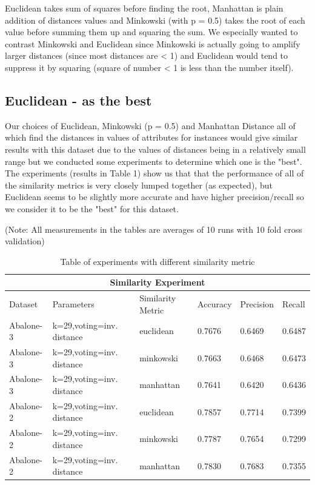 Euclidean takes sum of squares before finding the root, Manhattan is plain addition of distances values and Minkowski (with p = 0.5) takes the root of each value before summing them up and squaring the sum. We especially wanted to contrast Minkowski and Euclidean since Minkowski is actually going to amplify larger distances (since most distances are < 1) and Euclidean would tend to suppress it by squaring (square of number < 1 is less than the number itself). 


\subsection{Euclidean - as the best}

Our choices of Euclidean, Minkowski (p = 0.5) and Manhattan Distance all of which find the distances in values of attributes for instances would give similar results with this dataset due to the values of distances being in a relatively small range but we conducted some experiments to determine which one is the "best". The experiments (results in Table 1) show us that that the performance of all of the similarity metrics is very closely lumped together (as expected), but Euclidean seems to be slightly more accurate and have higher precision/recall so we consider it to be the "best" for this dataset.

(Note: All measurements in the tables are averages of 10 runs with 10 fold cross validation)

\begin{table}[h]
\centering
\begin{tabular}{|p{2cm}|p{3cm}||p{2cm}|p{1.5cm}|p{1.5cm}|p{1.5cm}|}
 \hline
 \multicolumn{6}{|c|}{Similarity Experiment} \\
 \hline
 Dataset & Parameters & Similarity Metric & Accuracy & Precision & Recall\\
 \hline
 Abalone-3 & k=29,voting=inv. distance &   euclidean & 0.7676  & 0.6469 & 0.6487\\
 \hline
 Abalone-3 & k=29,voting=inv. distance &   minkowski & 0.7663 & 0.6468 & 0.6473\\
 \hline
 Abalone-3 & k=29,voting=inv. distance &   manhattan & 0.7641 & 0.6420 & 0.6436\\ 
 \hline
 Abalone-2 & k=29,voting=inv. distance &   euclidean & 0.7857  & 0.7714 & 0.7399\\
 \hline
 Abalone-2 & k=29,voting=inv. distance &   minkowski & 0.7787 & 0.7654 & 0.7299\\
 \hline
 Abalone-2 & k=29,voting=inv. distance &   manhattan & 0.7830  & 0.7683 & 0.7355\\ 
 \hline

\end{tabular}
\caption{Table of experiments with different similarity metric}
\end{table}
\label{Figure 1}


